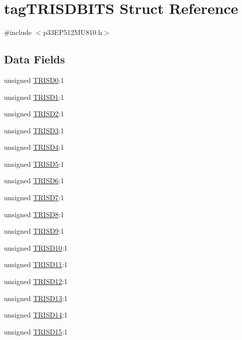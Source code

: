 \hypertarget{structtag_t_r_i_s_d_b_i_t_s}{}\section{tag\+T\+R\+I\+S\+D\+B\+I\+TS Struct Reference}
\label{structtag_t_r_i_s_d_b_i_t_s}


{\ttfamily \#include $<$p33\+E\+P512\+M\+U810.\+h$>$}

\subsection*{Data Fields}
\begin{DoxyCompactItemize}
\item 
unsigned \hyperlink{structtag_t_r_i_s_d_b_i_t_s_a02e71f0acc7d30edcc4265da7e1f304b}{T\+R\+I\+S\+D0}\+:1
\item 
unsigned \hyperlink{structtag_t_r_i_s_d_b_i_t_s_adfa57900d6ec4b87da98d854cc8ebf6a}{T\+R\+I\+S\+D1}\+:1
\item 
unsigned \hyperlink{structtag_t_r_i_s_d_b_i_t_s_a156c405a7dadcf0dbfb07cf4f60ddd63}{T\+R\+I\+S\+D2}\+:1
\item 
unsigned \hyperlink{structtag_t_r_i_s_d_b_i_t_s_a1ae081adf1f9d5e58bf84ded11b2579a}{T\+R\+I\+S\+D3}\+:1
\item 
unsigned \hyperlink{structtag_t_r_i_s_d_b_i_t_s_a79f0c732f439ef114017863c2d88f248}{T\+R\+I\+S\+D4}\+:1
\item 
unsigned \hyperlink{structtag_t_r_i_s_d_b_i_t_s_a067fbe843ef97f221b0562dca2c02d49}{T\+R\+I\+S\+D5}\+:1
\item 
unsigned \hyperlink{structtag_t_r_i_s_d_b_i_t_s_ac72e078f9449e51dfee0cdcfb14ac80a}{T\+R\+I\+S\+D6}\+:1
\item 
unsigned \hyperlink{structtag_t_r_i_s_d_b_i_t_s_a01348c49d0b9abaa2122fc6f44e020e3}{T\+R\+I\+S\+D7}\+:1
\item 
unsigned \hyperlink{structtag_t_r_i_s_d_b_i_t_s_a47b82d9099468a966f455fc4dc99dc0a}{T\+R\+I\+S\+D8}\+:1
\item 
unsigned \hyperlink{structtag_t_r_i_s_d_b_i_t_s_a8913bc20c7f3b24d7a3aedb3565d4b4b}{T\+R\+I\+S\+D9}\+:1
\item 
unsigned \hyperlink{structtag_t_r_i_s_d_b_i_t_s_a0d619aceb60632fbac9c2424afa9b02e}{T\+R\+I\+S\+D10}\+:1
\item 
unsigned \hyperlink{structtag_t_r_i_s_d_b_i_t_s_a5fa7aba0028822fc08c2ab7615820718}{T\+R\+I\+S\+D11}\+:1
\item 
unsigned \hyperlink{structtag_t_r_i_s_d_b_i_t_s_a6b38edfd15a5fa0426186f8e3af6402f}{T\+R\+I\+S\+D12}\+:1
\item 
unsigned \hyperlink{structtag_t_r_i_s_d_b_i_t_s_aab4e09f6ab629d9cd4128fd4bd1f6e8e}{T\+R\+I\+S\+D13}\+:1
\item 
unsigned \hyperlink{structtag_t_r_i_s_d_b_i_t_s_ab4cf58337b37013c8aaff89ced1ec666}{T\+R\+I\+S\+D14}\+:1
\item 
unsigned \hyperlink{structtag_t_r_i_s_d_b_i_t_s_afaf6933dc4134c5004cc14128c18be09}{T\+R\+I\+S\+D15}\+:1
\end{DoxyCompactItemize}


